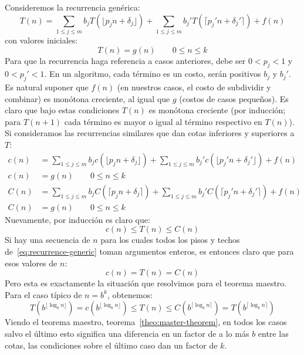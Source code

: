   Consideremos la recurrencia genérica:
  \begin{equation}
    \label{eq:recurrence-generic}
    T(n)
      = \sum_{1 \le j \le m} b_j T(\lfloor p_j n + \delta_j \rfloor)
          + \sum_{1 \le j \le m} b_j' T(\lceil p_j' n + \delta_j' \rceil)
          + f(n)
  \end{equation}
  con valores iniciales:
  \begin{equation}
    \label{eq:recurrence-generic-initial}
    T(n)
      = g(n) \qquad 0 \le n \le k
  \end{equation}
  Para que la recurrencia haga referencia a casos anteriores,
  debe ser \(0 < p_j < 1\) y \(0 < p_j' < 1\).
  En un algoritmo,
  cada término es un costo,
  serán positivos \(b_j\) y \(b_j'\).
  Es natural suponer que \(f(n)\)
  (en nuestros casos,
   el costo de subdividir y combinar)
  es monótona creciente,
  al igual que \(g\)
  (costos de casos pequeños).
  Es claro que bajo estas condiciones \(T(n)\) es monótona creciente
  (por inducción;
   para \(T(n + 1)\) cada término es mayor o igual al término respectivo
   en \(T(n)\)).
  Si consideramos las recurrencias similares
  que dan cotas inferiores y superiores a \(T\):
  \begin{align*}
    c(n)
      &= \sum_{1 \le j \le m} b_j c(\lfloor p_j n + \delta_j \rfloor)
           + \sum_{1 \le j \le m} b_j' c(\lfloor p_j' n + \delta_j' \rfloor)
           + f(n) \\
    c(n)
      &= g(n) \qquad 0 \le n \le k \\
    C(n)
      &= \sum_{1 \le j \le m} b_j C(\lceil p_j n + \delta_j \rceil)
           + \sum_{1 \le j \le m} b_j' C(\lceil p_j' n + \delta_j' \rceil)
           + f(n) \\
    C(n)
      &= g(n) \qquad 0 \le n \le k
  \end{align*}
  Nuevamente,
  por inducción es claro que:
  \begin{equation*}
    c(n) \le T(n) \le C(n)
  \end{equation*}
  Si hay una secuencia de \(n\) para los cuales todos los pisos y techos
  de~\eqref{eq:recurrence-generic} toman argumentos enteros,
  es entonces claro que para esos valores de \(n\):
  \begin{equation*}
    c(n) = T(n) = C(n)
  \end{equation*}
  Pero esta es exactamente la situación que resolvimos para el teorema maestro.
  Para el caso típico de \(n = b^k\),
  obtenemos:
  \begin{equation*}
    T(b^{\lfloor \log_b n \rfloor}) = c(b^{\lfloor \log_b n \rfloor})
      \le T(n)
      \le C(b^{\lceil \log_b n \rceil}) = T(b^{\lceil \log_b n \rceil})
  \end{equation*}
  Viendo el teorema maestro,
  teorema~\ref{theo:master-theorem},
  en todos los casos salvo el último
  esto significa una diferencia en un factor de a lo más \(b\) entre las cotas,
  las condiciones sobre el último caso dan un factor de \(k\).

